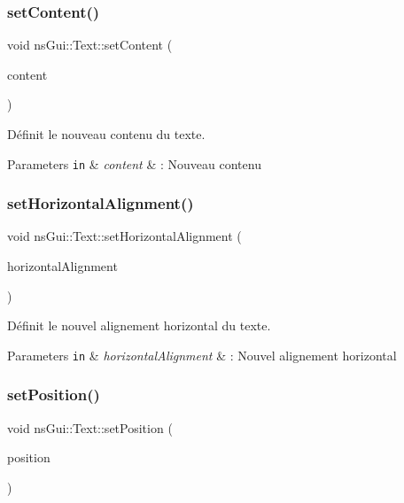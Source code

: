 \subsubsection{\texorpdfstring{set\+Content()}{setContent()}}
{\footnotesize\ttfamily void ns\+Gui\+::\+Text\+::set\+Content (\begin{DoxyParamCaption}\item[{const std\+::string \&}]{content }\end{DoxyParamCaption})}



Définit le nouveau contenu du texte. 


\begin{DoxyParams}[1]{Parameters}
\mbox{\tt in}  & {\em content} & \+: Nouveau contenu \\
\hline
\end{DoxyParams}
\mbox{\label{classns_gui_1_1_text_a952d6bb9e10c33aa446ff17fd73944a9}} 
\subsubsection{\texorpdfstring{set\+Horizontal\+Alignment()}{setHorizontalAlignment()}}
{\footnotesize\ttfamily void ns\+Gui\+::\+Text\+::set\+Horizontal\+Alignment (\begin{DoxyParamCaption}\item[{const \hyperlink{classns_gui_1_1_text_a78bb37c174a4f37eec2b7d69459ee7dc}{Horizontal\+Alignment} \&}]{horizontal\+Alignment }\end{DoxyParamCaption})}



Définit le nouvel alignement horizontal du texte. 


\begin{DoxyParams}[1]{Parameters}
\mbox{\tt in}  & {\em horizontal\+Alignment} & \+: Nouvel alignement horizontal \\
\hline
\end{DoxyParams}
\mbox{\label{classns_gui_1_1_text_ae258c9cd1203c3e52b7728e0211e9daa}} 
\subsubsection{\texorpdfstring{set\+Position()}{setPosition()}}
{\footnotesize\ttfamily void ns\+Gui\+::\+Text\+::set\+Position (\begin{DoxyParamCaption}\item[{const \hyperlink{classns_graphics_1_1_vec2_d}{ns\+Graphics\+::\+Vec2D} \&}]{position }\end{DoxyParamCaption})}



